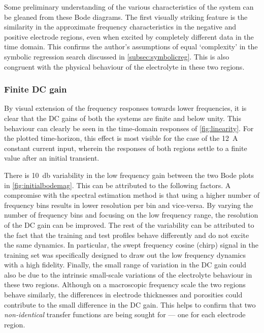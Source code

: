 Some preliminary understanding of the  various characteristics of the system can
be gleaned from these Bode diagrams.  The first visually striking feature is the
similarity  in the  approximate frequency  characteristics in  the negative  and
positive electrode  regions, even when  excited by completely different  data in
the time domain. This confirms the author's assumptions of equal `complexity' in
the symbolic  regression search discussed in \cref{subsec:symbolicreg}.  This is
also  congruent with  the physical  behaviour of  the electrolyte  in these  two
regions.

\subsubsection*{Finite DC gain}
By visual  extension of  the frequency responses  towards lower  frequencies, it
is  clear  that  the  DC  gains  of  both  the  systems  are  finite  and  below
unity.  This  behaviour  can  clearly  be  seen  in  the  time-domain  responses
of \cref{fig:linearity}.  For  the plotted  time-horizon,  this  effect is  most
visible for the case of the \SI{12}{\ampere} constant current input, wherein the
responses of both regions settle to a finite value after an initial transient.

There is \approx\SI{10}{\decibel} variability in  the low frequency gain between
the two Bode  plots in \cref{fig:initialbodemag}. This can be  attributed to the
following  factors. A  compromise with  the spectral  estimation method  is that
using a higher number of frequency bins  results in lower resolution per bin and
vice-versa. By  varying the number  of frequency bins  and focusing on  the low
frequency range, the resolution of the DC  gain can be improved. The rest of the
variability can  be attributed to the  fact that the training  and test profiles
behave differently and do not excite the same dynamics. In particular, the swept
frequency cosine (chirp) signal in the training set was specifically designed to
draw out  the low frequency  dynamics with a  high fidelity. Finally,  the small
range of variation in the DC gain could also be due to the intrinsic small-scale
variations of  the electrolyte  behaviour in  these two  regions. Although  on a
macroscopic frequency scale the two regions behave similarly, the differences in
electrode thicknesses and porosities could contribute to the small difference in
the  DC gain.  This  helps  to confirm  that  two \emph{non-identical}  transfer
functions are being sought for --- one for each electrode region.

